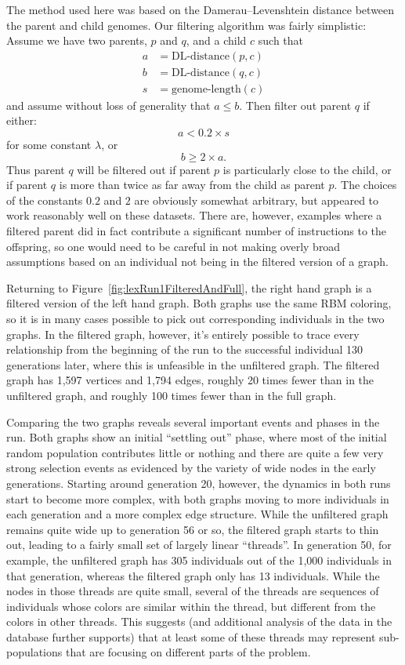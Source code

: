 \documentclass{sig-alternate}
\begin{document}
The method used here was based on the Damerau--Levenshtein distance between the
parent and child genomes. Our filtering algorithm was fairly simplistic: Assume we have two parents, $p$ and $q$, and a child $c$ such that
\begin{align*}
	a & = \textrm{DL-distance}(p, c) \\
	b & = \textrm{DL-distance}(q, c) \\
	s & = \textrm{genome-length}(c)
\end{align*}
and assume without loss of generality that $a \leq b$.
Then filter out parent $q$ if either:
\[
	a < 0.2 \times s
\]
for some constant $\lambda$, or
\[
	b \geq 2 \times a.
\]
Thus parent $q$ will be filtered out if parent $p$ is particularly close to
the child, or if parent $q$ is more than twice as far away from the child as
parent $p$. The choices of the constants $0.2$ and $2$ are obviously somewhat
arbitrary, but appeared to work reasonably well on these datasets. There are,
however, examples where a filtered parent did in fact contribute a significant
number of instructions to the offspring, so one would need to be careful in not
making overly broad assumptions based on an individual not being in the filtered
version of a graph.

Returning to Figure~\ref{fig:lexRun1FilteredAndFull}, the right hand graph is
a filtered version of the left hand graph. Both graphs use the same RBM
coloring, so it is in many cases possible to pick out corresponding individuals
in the two graphs. In the filtered graph, however, it's entirely possible to
trace every relationship from the beginning of the run to the successful
individual 130 generations later, where this is unfeasible in the
unfiltered graph. The filtered graph has 1,597 vertices and 1,794 edges, roughly
20 times fewer than in the unfiltered graph, and roughly 100 times fewer than
in the full graph.

Comparing the two graphs reveals several important events and phases 
in the run. Both graphs show an initial 
``settling out'' phase, where most of the initial random population contributes
little or nothing and there are quite a few very strong selection events as
evidenced by the variety of wide nodes in the early generations. Starting
around generation 20, however, the dynamics in both runs start to become more
complex, with both graphs moving to more individuals in each generation and a
more complex edge structure. While the unfiltered graph remains quite wide up to
generation 56 or so, the filtered graph starts to thin out, leading to a fairly
small set of largely linear ``threads''. In generation 50, for example, the 
unfiltered graph has 305 individuals out of the 1,000 individuals in that 
generation, whereas the filtered graph only has 13 individuals. While the nodes in
those threads are quite small, several of the threads are sequences of individuals
whose colors are similar within the thread, but different from the colors in
other threads. This suggests (and additional analysis of the data in the
database further supports) that at least some of these threads may represent
sub-populations that are focusing on different parts of the problem.
\end{document}
